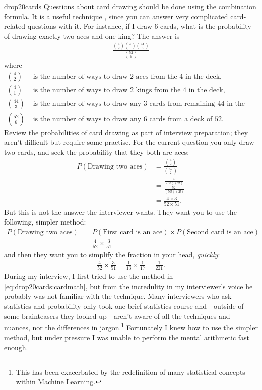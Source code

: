 \begin{answer}{drop20cards}
Questions about card drawing should be done using the combination formula.
It is a useful technique , since you can answer very complicated card-related questions with it.
For instance, if I draw 6 cards, what is the probability of drawing exactly two aces and one king?
The answer is
\begin{align}
 \frac{\binom{4}{2} \binom{4}{1} \binom{44}{3} }{\binom{52}{6} }
\end{align}
where
\begin{align*}
\binom{4}{2}&
  \text{ is the number of ways to draw 2 aces from the 4 in the deck,} \\
\binom{4}{1}&
  \text{ is the number of ways to draw 2 kings from the 4 in the deck,} \\
\binom{44}{3}&
  \text{ is the number of ways to draw  any 3 cards from remaining 44 in the deck,} \\
\binom{52}{6}&
  \text{ is the number of ways to draw any 6 cards from a deck of 52.}
\end{align*}
Review the probabilities of card drawing as part of interview preparation; they aren't difficult but require some practise.
For the current question you only draw two cards, and seek the probability that they both are aces:
\begin{align}
 \label{eq:drop20cards:cardmath}
P(\text{Drawing two aces})
&= \frac{\binom{4}{2} }{\binom{52}{2} } \\
&= \frac{ \frac{4!}{(2!)(2!)}  }{ \frac{52!}{ (50!) (2!) } } \nonumber \\
&= \frac{ 4 \times 3  }{ 52 \times 51 } \nonumber
\text{.}
\end{align}
But this is not the answer the interviewer wants.
They want you to use the following, simpler method:
\begin{align*}
P(\text{Drawing two aces})
&=
P(\text{First card is an ace})
\times
P(\text{Second card is an ace})
\\
&=
\frac{4}{52}
\times
\frac{3}{51}
\end{align*}
and then they want you to simplify the fraction in your head, \emph{quickly}:
\begin{align*}
\frac{4}{52}
\times
\frac{3}{51}
=
\frac{1}{13}
\times
\frac{1}{17}
=
\frac{1}{221}
\text{.}
\end{align*}
During my interview, I first tried to use the method in
\eqref{eq:drop20cards:cardmath},
but from the incredulity in my interviewer's voice he probably was not familiar with the technique.
Many interviewers who ask statistics and probability only took one brief statistics course and---outside of some brainteasers they looked up---aren't aware of all the techniques and nuances, nor the differences in jargon.\footnote{This has been exacerbated by the redefinition of many statistical concepts within Machine Learning.}
Fortunately I knew how to use the simpler method, but under pressure I was unable to perform the mental arithmetic fast enough.
\end{answer}
